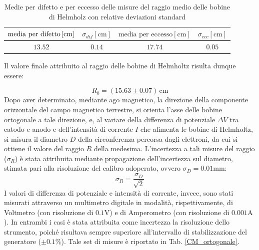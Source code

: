 \documentclass[]{article}
\begin{document}
    \begin{table}[H]
        \centering
    
        \begin{tabular} {||c|c||c|c||}
            \hline
            $ \text{media per difetto\,} [\text{cm}] $ & $\sigma_{dif} [\text{cm}] $ & $ \text{media per eccesso} [\text{cm}] $ & $\sigma_{ecc} [\text{cm}] $\\
            \hline \hline
    
            $ 13.52 $ & $ 0.14 $ & $ 17.74 $ & $ 0.05 $ \\\hline
    
        \end{tabular}
        \caption{Medie per difetto e per eccesso delle misure del raggio medio delle bobine di Helmholz con relative deviazioni standard}
        \label{media_devst_Rb}
    
    \end{table}

    Il valore finale attribuito al raggio delle bobine di Helmholtz risulta dunque essere:

    \begin{equation}
        \label{misura_Rb}
        R_b = (15.63 \pm 0.07) \, \text{cm}
    \end{equation} 
    Dopo aver determinato, mediante ago magnetico, la direzione della componente orizzontale del campo magnetico terrestre, si orienta l'asse delle bobine ortogonale a tale direzione, e, al variare della differenza di potenziale $\Delta V $ tra catodo e anodo e dell'intensità di corrente $I$ che alimenta le bobine di Helmholtz, si misura il diametro $D$ della circonferenza percorsa dagli elettroni, da cui si ottiene il valore del raggio $R$ della medesima. L'incertezza a tali misure del raggio ($\sigma_{R}$) è stata attribuita mediante propagazione dell'incertezza sul diametro, stimata pari alla risoluzione del calibro adoperato, ovvero  $\sigma_{D}= 0.01 \text{mm}$: 
    \begin{equation}
        \label{sigma_raggioCirc}
        \sigma_{R} = \frac{\sigma_{D}}{\sqrt{2} }
    \end{equation}
    I valori di differenza di potenziale e intensità di corrente, invece, sono stati misurati attraverso un multimetro digitale in modalità, rispettivamente, di Voltmetro (con risoluzione di $0.1 \text{V}$) e di Amperometro (con risoluzione di $0.001 \text{A}$). In entrambi i casi è stata attribuita come incertezza la risoluzione dello strumento, poiché risultava sempre superiore all'intervallo di stabilizzazione del generatore ($\pm 0.1 \%$). Tale set di misure è riportato in Tab. \ref{CM_ortogonale}. \\
    
\end{document}
